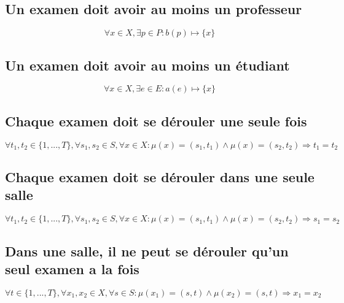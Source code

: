 \documentclass[a4paper,11pt]{article}
\begin{document}
\subsection {Un examen doit avoir au moins un professeur}
\begin{displaymath}
\forall x \in X, \exists p \in P : b(p) \mapsto \{x\} 
\end{displaymath}

\subsection {Un examen doit avoir au moins un étudiant}
\begin{displaymath}
\forall x \in X, \exists e \in E : a(e) \mapsto \{x\}
\end{displaymath}

\subsection {Chaque examen doit se dérouler une seule fois}
\begin{displaymath}
\forall t_{1}, t_{2} \in \{1,...,T\},\forall s_{1},s_{2} \in S, \forall x \in X : \mu(x) = (s_{1},t_{1}) \wedge \mu(x) = (s_{2},t_{2}) \Rightarrow t_{1} = t_{2}
\end{displaymath}

\subsection {Chaque examen doit se dérouler dans une seule salle}
\begin{displaymath}
\forall t_{1}, t_{2} \in \{1,...,T\},\forall s_{1},s_{2} \in S, \forall x \in X : \mu(x) = (s_{1},t_{1}) \wedge \mu(x) = (s_{2},t_{2}) \Rightarrow s_{1} = s_{2}
\end{displaymath}

\subsection {Dans une salle, il ne peut se dérouler qu'un seul examen a la fois}
\begin{displaymath}
\forall t \in \{1,...,T\},\forall x_{1},x_{2} \in X, \forall s \in S : \mu(x_{1}) = (s,t) \wedge \mu(x_{2}) = (s,t) \Rightarrow x_{1} = x_{2}
\end{displaymath}	
\end{document}
